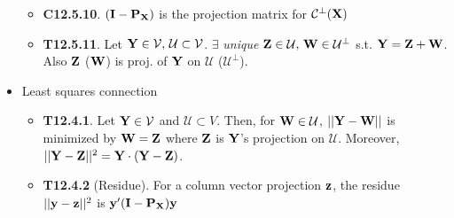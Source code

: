 \documentclass[a4paper, oneside]{book}
\begin{document}
\begin{itemize}
\begin{itemize}
	\item \textbf{C12.5.10}. $(\mathbf{I-P}_\mathbf{X})$ is the projection matrix for $\mathcal{C}^\perp(\mathbf{X})$
	\item \textbf{T12.5.11}. Let $\mathbf{Y} \in \mathcal{V},\,\mathcal{U}\subset\mathcal{V}$. $\exists$ \textit{unique} $\mathbf{Z}\in \mathcal{U},\,\mathbf{W}\in\mathcal{U}^\perp$ s.t. $\mathbf{Y}=\mathbf{Z+W}$. Also $\mathbf{Z}$ ($\mathbf{W}$) is proj. of $\mathbf{Y}$ on $\mathcal{U}$ ($\mathcal{U}^\perp$).
	\end{itemize}
\item Least squares connection
	\begin{itemize}
	\item \textbf{T12.4.1}. Let $\mathbf{Y} \in \mathcal{V}$ and $\mathcal{U}\subset V$. Then, for $\mathbf{W}\in\mathcal{U}$, $||\mathbf{Y-W}||$ is minimized by $\mathbf{W}=\mathbf{Z}$ where $\mathbf{Z}$ is $\mathbf{Y}$'s projection on $\mathcal{U}$. Moreover, $||\mathbf{Y-Z}||^2=\mathbf{Y\cdot(Y-Z)}$.
	\item \textbf{T12.4.2} (Residue). For a column vector projection $\mathbf{z}$, the residue $||\mathbf{y}-\mathbf{z}||^2$ is $\mathbf{y}'(\mathbf{I-\mathbf{P}_\mathbf{X}})\mathbf{y}$
	\end{itemize}
\end{itemize}




















\end{document}
